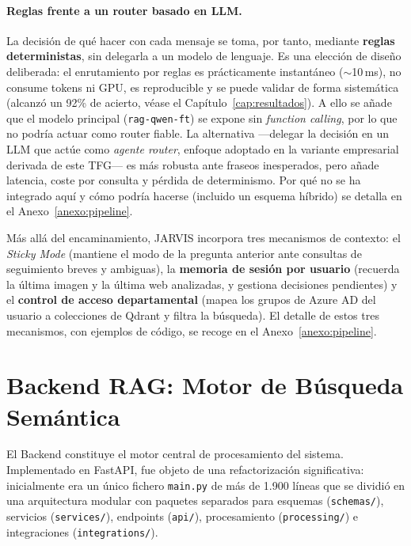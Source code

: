 \paragraph{Reglas frente a un router basado en LLM.} La decisión de qué hacer con cada mensaje se toma, por tanto, mediante \textbf{reglas deterministas}, sin delegarla a un modelo de lenguaje. Es una elección de diseño deliberada: el enrutamiento por reglas es prácticamente instantáneo ($\sim$10\,ms), no consume tokens ni GPU, es reproducible y se puede validar de forma sistemática (alcanzó un 92\% de acierto, véase el Capítulo~\ref{cap:resultados}). A ello se añade que el modelo principal (\texttt{rag-qwen-ft}) se expone sin \textit{function calling}, por lo que no podría actuar como router fiable. La alternativa ---delegar la decisión en un LLM que actúe como \textit{agente router}, enfoque adoptado en la variante empresarial derivada de este TFG--- es más robusta ante fraseos inesperados, pero añade latencia, coste por consulta y pérdida de determinismo. Por qué no se ha integrado aquí y cómo podría hacerse (incluido un esquema híbrido) se detalla en el Anexo~\ref{anexo:pipeline}.

Más allá del encaminamiento, JARVIS incorpora tres mecanismos de contexto: el \textit{Sticky Mode} (mantiene el modo de la pregunta anterior ante consultas de seguimiento breves y ambiguas), la \textbf{memoria de sesión por usuario} (recuerda la última imagen y la última web analizadas, y gestiona decisiones pendientes) y el \textbf{control de acceso departamental} (mapea los grupos de Azure AD del usuario a colecciones de Qdrant y filtra la búsqueda). El detalle de estos tres mecanismos, con ejemplos de código, se recoge en el Anexo~\ref{anexo:pipeline}.

\section{Backend RAG: Motor de Búsqueda Semántica}
\label{sec:backend-rag}

El Backend constituye el motor central de procesamiento del sistema. Implementado en FastAPI, fue objeto de una refactorización significativa: inicialmente era un único fichero \texttt{main.py} de más de 1.900 líneas que se dividió en una arquitectura modular con paquetes separados para esquemas (\texttt{schemas/}), servicios (\texttt{services/}), endpoints (\texttt{api/}), procesamiento (\texttt{processing/}) e integraciones (\texttt{integrations/}).

